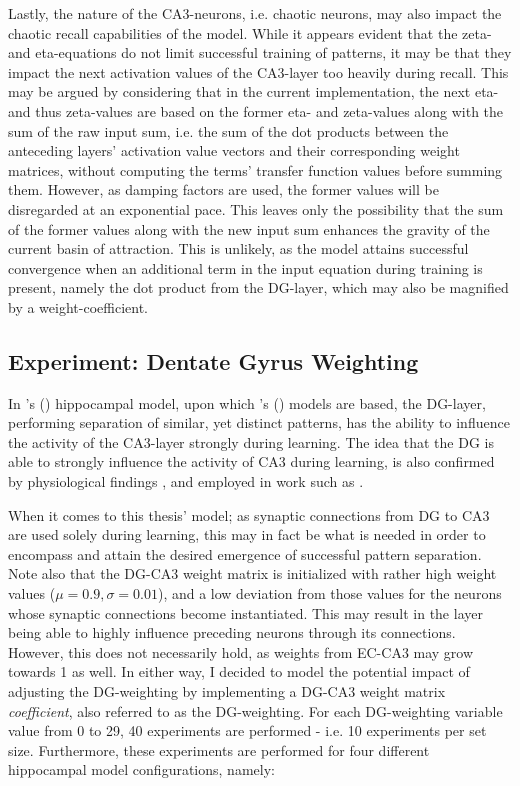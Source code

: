 Lastly, the nature of the CA3-neurons, i.e. chaotic neurons, may also impact the chaotic recall capabilities of the model. While it appears evident that the zeta- and eta-equations do not limit successful training of patterns, it may be that they impact the next activation values of the CA3-layer too heavily during recall. This may be argued by considering that in the current implementation, the next eta- and thus zeta-values are based on the former eta- and zeta-values along with the sum of the raw input sum, i.e. the sum of the dot products between the anteceding layers' activation value vectors and their corresponding weight matrices, without computing the terms' transfer function values before summing them.
However, as damping factors are used, the former values will be disregarded at an exponential pace. This leaves only the possibility that the sum of the former values along with the new input sum enhances the gravity of the current basin of attraction. This is unlikely, as the model attains successful convergence when an additional term in the input equation during training is present, namely the dot product from the DG-layer, which may also be magnified by a weight-coefficient.


\subsection{Experiment: Dentate Gyrus Weighting}

In \citeauthor{Wakagi2008}'s (\citeyear{Wakagi2008}) hippocampal model, upon which \citeauthor{Hattori2010}'s (\citeyear{Hattori2010, Hattori2014}) models are based, the DG-layer, performing separation of similar, yet distinct patterns, has the ability to influence the activity of the CA3-layer strongly during learning. The idea that the DG is able to strongly influence the activity of CA3 during learning, is also confirmed by physiological findings \citep{Rolls1998chpt6}, and employed in work such as \citep{Norman2003}.

When it comes to this thesis' model; as synaptic connections from DG to CA3 are used solely during learning, this may in fact be what is needed in order to encompass and attain the desired emergence of successful pattern separation. Note also that the DG-CA3 weight matrix is initialized with rather high weight values ($\mu=0.9, \sigma=0.01$), and a low deviation from those values for the neurons whose synaptic connections become instantiated. This may result in the layer being able to highly influence preceding neurons through its connections. However, this does not necessarily hold, as weights from EC-CA3 may grow towards 1 as well. In either way, I decided to model the potential impact of adjusting the DG-weighting by implementing a DG-CA3 weight matrix \textit{coefficient}, also referred to as the DG-weighting. For each DG-weighting variable value from 0 to 29, 40 experiments are performed - i.e. 10 experiments per set size. Furthermore, these experiments are performed for four different hippocampal model configurations, namely:

